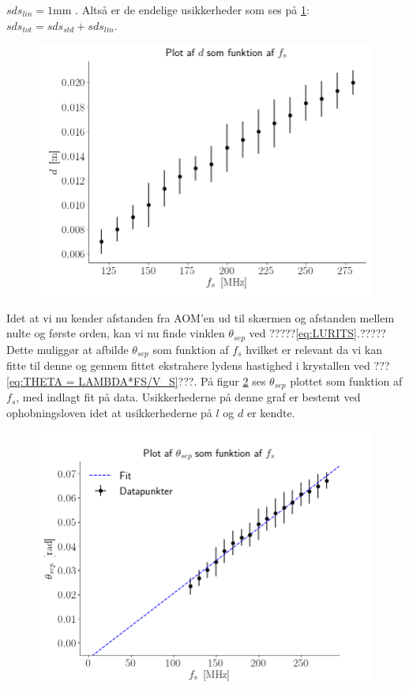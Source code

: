 \documentclass[main]{subfiles}
\begin{document}
$ sds_{lin} = 1 \si{\milli\meter} $ . Altså er de endelige usikkerheder som ses på \cref{fig:rawdata_modul1}:  $ sds_{tot} = sds_{std} + sds_{lin} $.
\begin{figure}[H]
    \centering
    \includegraphics[width=\linewidth]{tegninger/rawdata_modul1.png}
    \caption{}
    \label{fig:rawdata_modul1}
\end{figure}
Idet at vi nu kender afstanden fra AOM'en ud til skærmen og afstanden mellem nulte og første orden, kan vi nu finde vinklen $\theta_{sep}$ ved ?????\cref{eq:LURITS}.?????%
Dette muliggør at afbilde $\theta_{sep}$ som funktion af $f_s$ hvilket er relevant da vi kan fitte til denne og gennem fittet ekstrahere lydens hastighed i krystallen ved ???\cref{eq:THETA = LAMBDA*FS/V_S}???. %
På figur \cref{fig:graf1} ses $\theta_{sep}$ plottet som funktion af $f_s$, med indlagt fit på data. Usikkerhederne på denne graf er bestemt ved ophobningsloven idet at usikkerhederne på $l$ og $d$ er kendte.
\begin{figure}[H]
    \centering
    \includegraphics[width=\linewidth]{tegninger/graf1.png}
    \caption{}
    \label{fig:graf1}
\end{figure}
\end{document}
